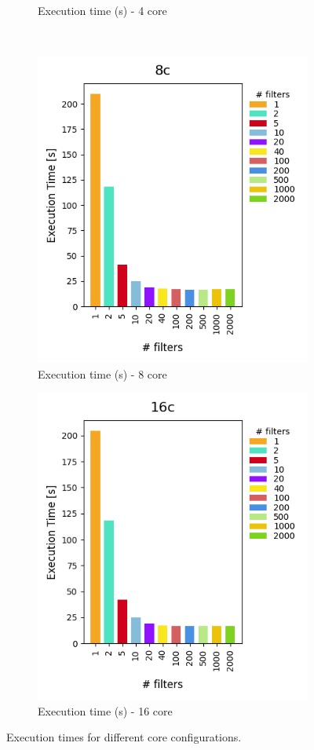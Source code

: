 \begin{figure}[H]
\begin{subfigure}[b]{0.45\textwidth}
    \caption{Execution time (s) - 4 core}
  \end{subfigure}
  \\
  \begin{subfigure}[b]{0.45\textwidth}
    \centering
    \includegraphics[scale=0.6]{images/4-Experiments/E2/fixedcores/8c/execTime.png}
    \caption{Execution time (s) - 8 core}
  \end{subfigure}
  \hfill
  \begin{subfigure}[b]{0.45\textwidth}
    \centering
    \includegraphics[scale=0.6]{images/4-Experiments/E2/fixedcores/16c/execTime.png}
    \caption{Execution time (s) - 16 core}
  \end{subfigure}
  \caption{Execution times for different core configurations.}
  \label{fig:execution-times}
\end{figure}



